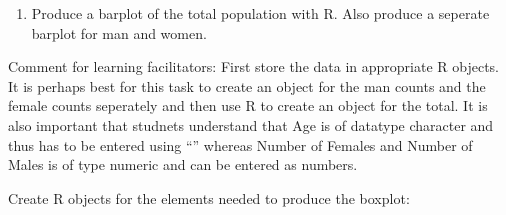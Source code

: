 \documentclass[letterpaper,10pt,english]{jupyterBook}
\begin{document}
\begin{enumerate}
%
\item {} 
\sphinxAtStartPar
Produce a barplot of the total population with R. Also produce a seperate barplot for man and women.

\end{enumerate}

\sphinxAtStartPar
Comment for learning facilitators: First store the data in appropriate R objects. It is perhaps best for this task to create an object for the man counts and the female counts seperately and then use R to create an object for the total. It is also important that studnets understand that Age is of data\sphinxhyphen{}type character and thus has to be entered using “” whereas Number of Females and Number of Males is of type numeric and can be entered as numbers.

\sphinxAtStartPar
Create R objects for the elements needed to produce the boxplot:
\end{document}

